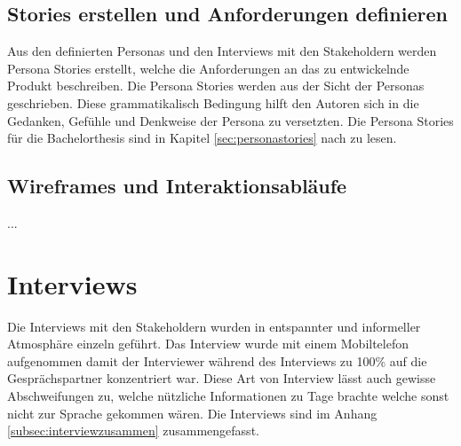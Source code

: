 \subsection{Stories erstellen und Anforderungen definieren}
Aus den definierten Personas und den Interviews mit den Stakeholdern werden Persona Stories erstellt, welche die Anforderungen an das zu entwickelnde Produkt beschreiben. Die Persona Stories werden aus der Sicht der Personas geschrieben. Diese grammatikalisch Bedingung hilft den Autoren sich in die Gedanken, Gefühle und Denkweise der Persona zu versetzten. Die Persona Stories für die Bachelorthesis sind in Kapitel \ref{sec:personastories} nach zu lesen.

\subsection{Wireframes und Interaktionsabläufe}
...




\section{Interviews}
\label{sec:interviews}

Die Interviews mit den Stakeholdern wurden in entspannter und informeller Atmosphäre einzeln geführt. Das Interview wurde mit einem Mobiltelefon aufgenommen damit der Interviewer während des Interviews zu 100\% auf die Gesprächspartner konzentriert war. Diese Art von Interview lässt auch gewisse Abschweifungen zu, welche nützliche Informationen zu Tage brachte welche sonst nicht zur Sprache gekommen wären. Die Interviews sind im Anhang \ref{subsec:interviewzusammen} zusammengefasst.